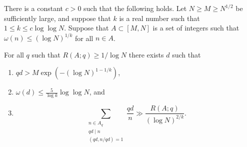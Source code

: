 \begin{lemma}\label{lem:usingq}
  \leanok
There is a constant $c>0$ such that the following holds. Let $N\geq M\geq N^{1/2}$ be sufficiently large, and suppose that $k$ is a real number such that $1\leq k \leq c\log\log N$. Suppose that $A\subset [M,N]$ is a set of integers such that $\omega(n)\leq (\log N)^{1/k}$ for all $n\in A$.

For all $q$ such that $R(A;q)\geq 1/\log N$ there exists $d$ such that
\begin{enumerate}
\item $qd > M\exp(-(\log N)^{1-1/k})$,
\item $\omega(d)\leq \tfrac{5}{\log k}\log\log N$, and
\item \[\sum_{\substack{n\in A_q\\qd\mid n\\ (qd,n/qd)=1}}\frac{qd}{n}\gg \frac{R(A;q)}{(\log N)^{2/k}}.\]
\end{enumerate}
\end{lemma}
